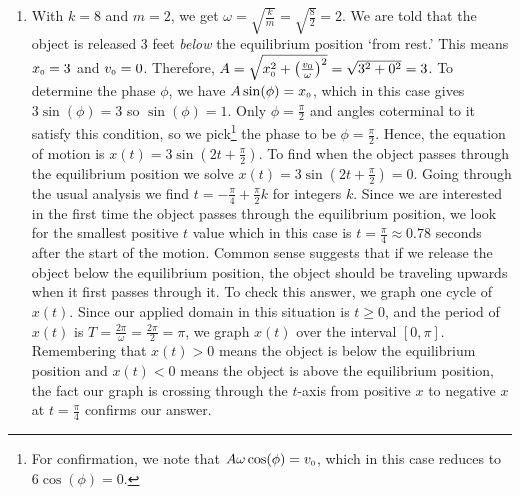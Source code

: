 \begin{ex}
\begin{enumerate}
\item  With $k = 8$ and $m = 2$, we get $\omega = \sqrt{\frac{k}{m}} = \sqrt{\frac{8}{2}} = 2$. We are told that the object is released 3 feet \textit{below} the equilibrium position `from rest.'  This means  $x_{\text{\tiny $0$}} = 3$ and  $v_{\text{\tiny $0$}} = 0$.  Therefore, $A = \sqrt{x_{\text{\tiny $0$}}^2 + \left( \frac{v_{\text{\tiny $0$}}}{\omega}\right)^2} = \sqrt{3^2 + 0^2} = 3$.  To determine the phase $\phi$, we have $A\sin(\phi) = x_{\text{\tiny $0$}}$, which in this case gives $3 \sin(\phi) = 3$ so $\sin(\phi) = 1$.  Only $\phi = \frac{\pi}{2}$ and angles coterminal to it satisfy this condition, so we pick\footnote{For confirmation, we note that $A\omega\cos(\phi) = v_{\text{\tiny $0$}}$, which in this case reduces to $6\cos(\phi) = 0$.} the phase to be $\phi = \frac{\pi}{2}$.  Hence, the equation of motion is $x(t) = 3\sin\left(2t + \frac{\pi}{2}\right)$.  To find when the object passes through the equilibrium position we solve $x(t)= 3\sin\left(2t + \frac{\pi}{2}\right) = 0$. Going through the usual analysis we find $t = -\frac{\pi}{4} + \frac{\pi}{2} k$ for integers $k$. Since we are interested in the first time the object passes through the equilibrium position, we look for the smallest positive $t$ value which in this case is $t = \frac{\pi}{4} \approx 0.78$ seconds after the  start of the motion.  Common sense suggests that if we release the object below the equilibrium position, the object should be traveling upwards when it first passes through it.  To check this answer, we graph one cycle of  $x(t)$.  Since our applied domain in this situation is $t \geq 0$, and the period of $x(t)$ is $T = \frac{2\pi}{\omega} = \frac{2\pi}{2} = \pi$, we graph $x(t)$ over the interval $[0,\pi]$.  Remembering that $x(t) > 0$ means the object is below the equilibrium position and $x(t) < 0$ means the object is above the equilibrium position, the fact our graph is crossing through the $t$-axis from positive $x$ to negative $x$ at $t = \frac{\pi}{4}$ confirms our answer.


\end{enumerate}
\end{ex}
